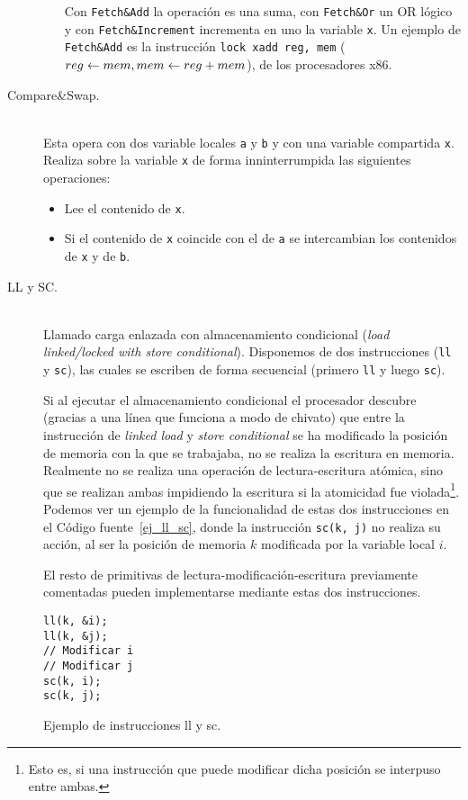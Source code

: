 \begin{description}
\begin{itemize}
                Con \verb|Fetch&Add| la operación es una suma, con \verb|Fetch&Or| un OR lógico y con \verb|Fetch&Increment| incrementa en uno la variable \verb|x|. Un ejemplo de \verb|Fetch&Add| es la instrucción \verb|lock xadd reg, mem| (${reg\leftarrow mem},\newline {mem\leftarrow reg + mem}$), de los procesadores x86.
        \end{itemize}
    \item [Compare\&Swap.]~\\
        Esta opera con dos variable locales \verb|a| y \verb|b| y con una variable compartida \verb|x|. Realiza sobre la variable \verb|x| de forma inninterrumpida las siguientes operaciones:
        \begin{itemize}
            \item Lee el contenido de \verb|x|.
            \item Si el contenido de \verb|x| coincide con el de \verb|a| se intercambian los contenidos de \verb|x| y de \verb|b|.
        \end{itemize}
    \item [LL y SC.]~\\
        Llamado carga enlazada con almacenamiento condicional (\emph{load linked/locked with store conditional}). Disponemos de dos instrucciones (\verb|ll| y \verb|sc|), las cuales se escriben de forma secuencial (primero \verb|ll| y luego \verb|sc|).

        Si al ejecutar el almacenamiento condicional el procesador descubre (gracias a una línea que funciona a modo de chivato) que entre la instrucción de \emph{linked load} y \emph{store conditional} se ha modificado la posición de memoria con la que se trabajaba, no se realiza la escritura en memoria. Realmente no se realiza una operación de lectura-escritura atómica, sino que se realizan ambas impidiendo la escritura si la atomicidad fue violada\footnote{Esto es, si una instrucción que puede modificar dicha posición se interpuso entre ambas.}. Podemos ver un ejemplo de la funcionalidad de estas dos instrucciones en el Código fuente~\ref{ej_ll_sc}, donde la instrucción \verb|sc(k, j)| no realiza su acción, al ser la posición de memoria $k$ modificada por la variable local $i$.

        El resto de primitivas de lectura-modificación-escritura previamente comentadas pueden implementarse mediante estas dos instrucciones.
\begin{listing}[H]
\begin{verbatim}
ll(k, &i);
ll(k, &j);
// Modificar i
// Modificar j
sc(k, i);
sc(k, j);
\end{verbatim}
\caption{Ejemplo de instrucciones ll y sc.}
\label{ej_ll_sc}
\end{listing}

\end{description}
